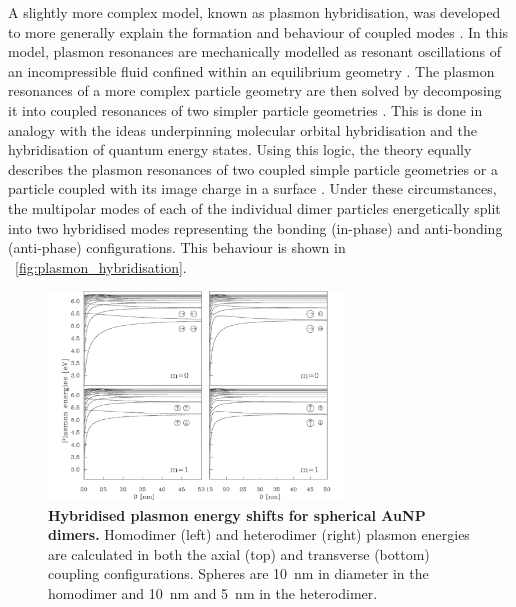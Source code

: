 \documentclass{article}
\begin{document}
A slightly more complex model, known as plasmon hybridisation, was developed to more generally explain the formation and behaviour of coupled modes \cite{prodan2003, prodan2004, nordlander2004}. In this model, plasmon resonances are mechanically modelled as resonant oscillations of an incompressible fluid confined within an equilibrium geometry \cite{prodan2004}. The plasmon resonances of a more complex particle geometry are then solved by decomposing it into coupled resonances of two simpler particle geometries \cite{prodan2003, prodan2004}. This is done in analogy with the ideas underpinning molecular orbital hybridisation and the hybridisation of quantum energy states. Using this logic, the theory equally describes the plasmon resonances of two coupled simple particle geometries \cite{nordlander2004} or a particle coupled with its image charge in a surface \cite{nordlander2004a}. Under these circumstances, the multipolar modes of each of the individual dimer particles energetically split into two hybridised modes representing the bonding (in-phase) and anti-bonding (anti-phase) configurations. This behaviour is shown in \figurename~\ref{fig:plasmon_hybridisation}.

\begin{figure}[bt]
\centering
\includegraphics[width=0.7\textwidth]{figures/literature/nordlander2004}
\caption[Hybridised plasmon energy shifts for spherical AuNP dimers]{\textbf{Hybridised plasmon energy shifts for spherical AuNP dimers.} Homodimer (left) and heterodimer (right) plasmon energies are calculated in both the axial (top) and transverse (bottom) coupling configurations. Spheres are \SI{10}{nm} in diameter in the homodimer and \SI{10}{nm} and \SI{5}{nm} in the heterodimer.}
\label{fig:nordlander_ph_modes}
\end{figure}
\end{document}
